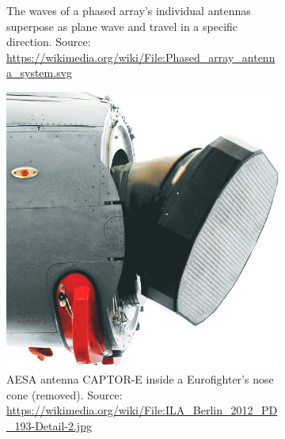 \begin{figure}[htbp]
    \centering
    \begin{subfigure}[t]{0.3\textwidth}
        \def\svgwidth{\linewidth} \tiny
        
        \caption{The waves of a phased array's individual antennas superpose as plane wave and travel in a specific direction. Source: \url{https://wikimedia.org/wiki/File:Phased_array_antenna_system.svg}}
        \label{fig:phased}
    \end{subfigure}
    \hfill
    \begin{subfigure}[t]{0.3\textwidth}
        \includegraphics[max width=\linewidth]{gfx/pictures/ILA_Berlin_2012_PD_193-Detail-2}
        \caption{AESA antenna CAPTOR-E inside a Eurofighter's nose cone (removed). Source: \url{https://wikimedia.org/wiki/File:ILA_Berlin_2012_PD_193-Detail-2.jpg}}
        \label{fig:aesa}
    \end{subfigure}
    \hfill
    \begin{subfigure}[t]{0.3\textwidth}

\end{subfigure}
\end{figure}
